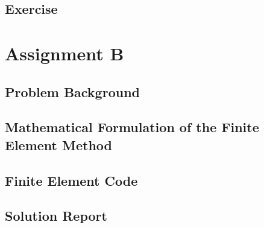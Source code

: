 \documentclass[a4paper, 11pt, oneside]{bookest}
\theoremstyle{definition}
\begin{document}
\section{Exercise}

\chapter{Assignment B}
\section{Problem Background}
\section{Mathematical Formulation of the Finite Element Method}
\section{Finite Element Code}
\section{Solution Report}
\end{document}
